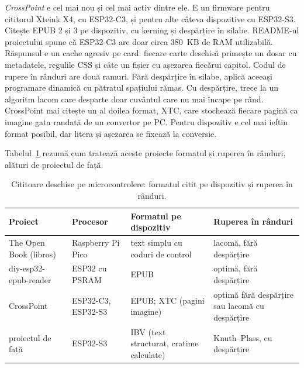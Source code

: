 \emph{CrossPoint} \citep{crosspoint} e cel mai nou și cel mai activ dintre ele. E un firmware
pentru cititorul Xteink X4, cu ESP32-C3, și pentru alte câteva dispozitive cu
ESP32-S3. Citește EPUB 2 și 3 pe dispozitiv, cu kerning și despărțire în
silabe. README-ul proiectului spune că ESP32-C3 are doar circa 380~KB de RAM
utilizabilă. Răspunsul e un cache agresiv pe card: fiecare carte deschisă
primește un dosar cu metadatele, regulile CSS și câte un fișier
cu așezarea fiecărui capitol. Codul de rupere în rânduri are două ramuri. Fără
despărțire în silabe, aplică aceeași programare dinamică cu pătratul spațiului
rămas. Cu despărțire, trece la un algoritm lacom care desparte doar cuvântul
care nu mai încape pe rând. CrossPoint mai citește un al doilea format, XTC,
care stochează fiecare pagină ca imagine gata randată de un convertor pe PC.
Pentru dispozitiv e cel mai ieftin format posibil, dar litera și așezarea se
fixează la conversie.

Tabelul~\ref{tab:stadiu-cititoare} rezumă cum tratează aceste proiecte
formatul și ruperea în rânduri, alături de proiectul de față.

\begin{table}[htbp]
  \centering
  \small
  \caption{Cititoare deschise pe microcontrolere: formatul citit pe dispozitiv
    și ruperea în rânduri.}
  \label{tab:stadiu-cititoare}
  \begin{tabularx}{\textwidth}{@{}>{\raggedright\arraybackslash}p{}
      >{\raggedright\arraybackslash}p{}
      >{\raggedright\arraybackslash}X >{\raggedright\arraybackslash}X@{}}
    \toprule
    Proiect & Procesor & Formatul pe dispozitiv & Ruperea în rânduri \\
    \midrule
    The Open Book (libros) & Raspberry Pi Pico & text simplu cu coduri de control
      & lacomă, fără despărțire \\
    diy-esp32-epub-reader & ESP32 cu PSRAM & EPUB & optimă, fără despărțire \\
    CrossPoint & ESP32-C3, ESP32-S3 & EPUB; XTC (pagini imagine)
      & optimă fără despărțire sau lacomă cu despărțire \\
    proiectul de față & ESP32-S3 & IBV (text structurat, cratime calculate)
      & Knuth–Plass, cu despărțire \\
    \bottomrule
  \end{tabularx}
\end{table}

